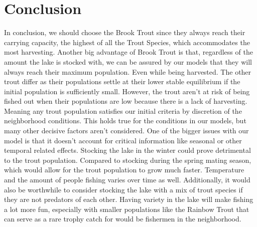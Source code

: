 \documentclass[letterpaper,12pt]{article}
\begin{document}
\section{Conclusion}
In conclusion, we should choose the Brook Trout since they always reach their carrying capacity, the highest of all the Trout Species, which accommodates the most harvesting. 
Another big advantage of Brook Trout is that, regardless of the amount the lake is stocked with, we can be assured by our models that they will always reach their maximum population. Even while being harvested. 
The other trout differ as their populations settle at their lower stable equilibrium if the initial population is sufficiently small. 
However, the trout aren’t at risk of being fished out when their populations are low because there is a lack of harvesting. Meaning any trout population satisfies our initial criteria by discretion of the neighborhood conditions. 
This holds true for the conditions in our models, but many other decisive factors aren’t considered.
One of the bigger issues with our model is that it doesn't account for critical information like seasonal or other temporal related effects. 
Stocking the lake in the winter could prove detrimental to the trout population. 
Compared to stocking during the spring mating season, which would allow for the trout population to grow much faster. 
Temperature and the amount of people fishing varies over time as well. 
Additionally, it would also be worthwhile to consider stocking the lake with a mix of trout species if they are not predators of each other. 
Having variety in the lake will make fishing a lot more fun, especially with smaller populations like the Rainbow Trout that can serve as a rare trophy catch for would be fishermen in the neighborhood.
\end{document}
